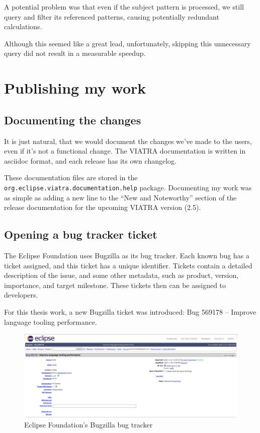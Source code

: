 \documentclass[11pt,a4paper,oneside]{report}
\begin{document}
A potential problem was that even if the subject pattern is processed, we still
query and filter its referenced patterns, causing potentially redundant
calculations.

Although this seemed like a great lead, unfortunately, skipping this unnecessary
query did not result in a measurable speedup.

\chapter{Publishing my work}
\section{Documenting the changes}
It is just natural, that we would document the changes we've made to the users,
even if it's not a functional change. The VIATRA documentation is written in
asciidoc format, and each release has its own changelog.

These documentation files are stored in the
\texttt{org.eclipse.viatra.documentation.help} package. Documenting my work was
as simple as adding a new line to the ``New and Noteworthy'' section of the
release documentation for the upcoming VIATRA version (2.5).

\section{Opening a bug tracker ticket}
The Eclipse Foundation uses Bugzilla as its bug tracker. Each known bug has a
ticket assigned, and this ticket has a unique identifier. Tickets contain
a detailed description of the issue, and some other metadata, such as product,
version, importance, and target milestone. These tickets then can be assigned to
developers.

For this thesis work, a new Bugzilla ticket was introduced:
Bug 569178 -- Improve language tooling performance.

\begin{figure}[ht]
\centering
\includegraphics[width=150mm, keepaspectratio]{figures/bugzilla.png}
\caption{Eclipse Foundation's Bugzilla bug tracker}
\label{fig:bugzilla}
\end{figure}
\end{document}
